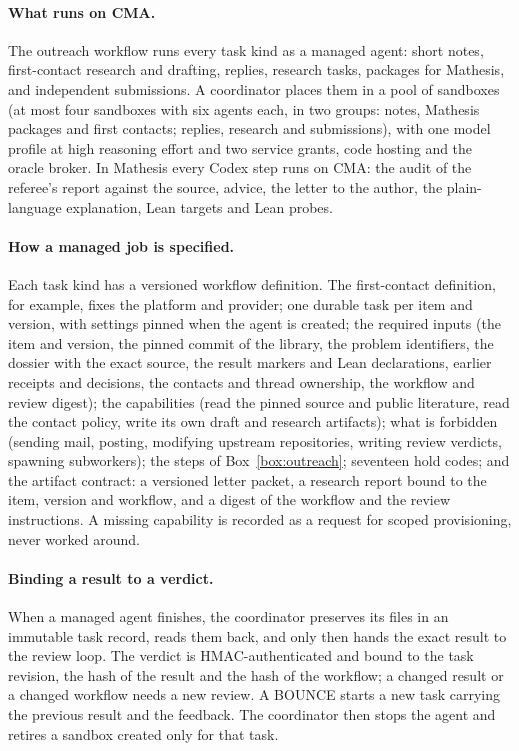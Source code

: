 \documentclass[11pt]{article}
\begin{document}
\paragraph{What runs on CMA.} The outreach workflow runs every task kind as a
managed agent: short notes, first-contact research and drafting, replies,
research tasks, packages for Mathesis, and independent submissions. A
coordinator places them in a pool of sandboxes (at most four sandboxes with
six agents each, in two groups: notes, Mathesis packages and first contacts;
replies, research and submissions), with one model profile at high reasoning effort and two service
grants, code hosting and the oracle broker. In Mathesis every Codex step runs
on CMA: the audit of the referee's report against the source, advice, the
letter to the author, the plain-language explanation, Lean targets and Lean
probes.

\paragraph{How a managed job is specified.} Each task kind has a versioned
workflow definition. The first-contact definition, for example, fixes the
platform and provider; one durable task per item and version, with settings
pinned when the agent is created; the required inputs (the item and version,
the pinned commit of the library, the problem identifiers, the dossier with
the exact source, the result markers and Lean declarations, earlier receipts
and decisions, the contacts and thread ownership, the workflow and review
digest); the capabilities (read the pinned source and public literature,
read the contact policy, write its own draft and research artifacts); what is
forbidden (sending mail, posting, modifying upstream repositories, writing
review verdicts, spawning subworkers); the steps of Box~\ref{box:outreach};
seventeen hold codes; and the artifact contract: a versioned letter packet,
a research report bound to the item, version and workflow, and a digest of the
workflow and the review instructions. A missing capability is recorded as a
request for scoped provisioning, never worked around.

\paragraph{Binding a result to a verdict.} When a managed agent finishes, the
coordinator preserves its files in an immutable task record, reads them back,
and only then hands the exact result to the review loop. The verdict is
HMAC-authenticated and bound to the task revision, the hash of the result and
the hash of the workflow; a changed result or a changed workflow needs a new
review. A BOUNCE starts a new task carrying the previous result and the
feedback. The coordinator then stops the agent and retires a sandbox created
only for that task.
\end{document}
